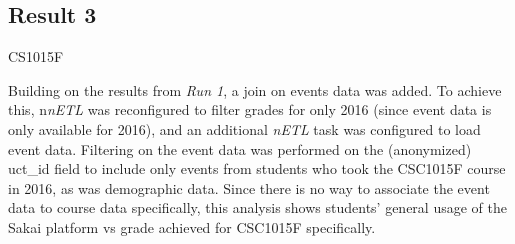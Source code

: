 \subsection{Result 3}

CS1015F

Building on the results from \textit{Run 1}, a join on events data was added. To achieve this, n\textit{nETL} was reconfigured to filter grades for only 2016 (since event data is only available for 2016), and an additional \textit{nETL} task was configured to load event data. Filtering on the event data was performed on the (anonymized) uct\_id field to include only events from students who took the CSC1015F course in 2016, as was demographic data. Since there is no way to associate the event data to course data specifically, this analysis shows students' general usage of the Sakai platform vs grade achieved for CSC1015F specifically.